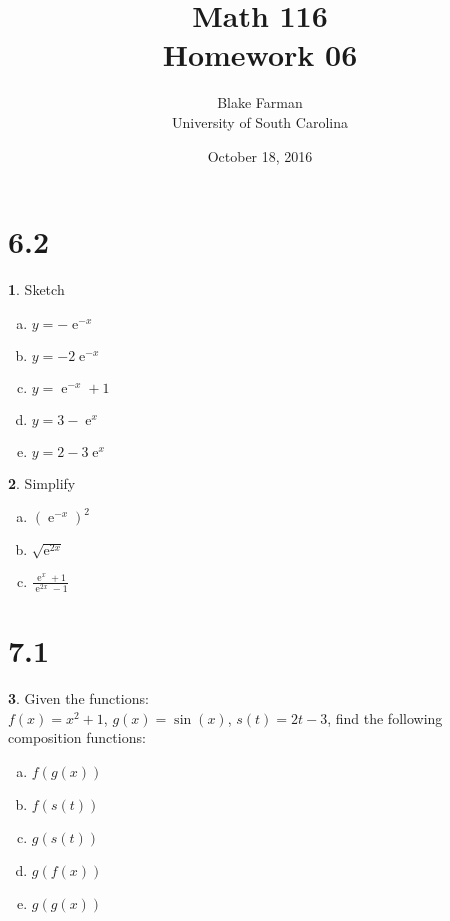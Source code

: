 \documentclass[12pt]{book}
\author{Blake Farman\\University of South Carolina}
\title{Math 116\\Homework 06}
\date{October 18, 2016}
\theoremstyle{definition}
\newtheorem{thm}{}
\begin{document}
\maketitle

\section*{6.2}
\renewcommand{\exp}[1]{\operatorname{e}^{#1}}

\setcounter{thm}{1}
\begin{thm}
  Sketch
  \begin{enumerate}[(a)]
  \item
    $\displaystyle{y = -\exp{-x}}$
  \item
    $\displaystyle{y = -2\exp{-x}}$
  \item
    $\displaystyle{y = \exp{-x} + 1}$
  \item
    $\displaystyle{y = 3 - \exp{x}}$
  \item
    $\displaystyle{y = 2 - 3\exp{x}}$
  \end{enumerate}
\end{thm}

\setcounter{thm}{5}

\begin{thm}
  Simplify
  \begin{enumerate}[(a)]
  \item
    $\displaystyle{\left(\exp{-x}\right)^2}$
  \item
    $\displaystyle{\sqrt{\exp{2x}}}$
  \item
    $\displaystyle{\frac{\exp{x} + 1}{\exp{2x} - 1}}$
  \end{enumerate}
\end{thm}

\section*{7.1}

\setcounter{thm}{1}
\begin{thm}
  Given the functions:\\
  $f(x) = x^2 + 1$, $g(x) = \sin(x)$, $s(t) = 2t - 3$, find the following composition functions:
  \begin{enumerate}[(a)]
  \item
    $\displaystyle{f(g(x))}$
  \item
    $\displaystyle{f(s(t))}$
  \item
    $\displaystyle{g(s(t))}$
  \item
    $\displaystyle{g(f(x))}$
  \item
    $\displaystyle{g(g(x))}$
  \end{enumerate}
\end{thm}
\end{document}
